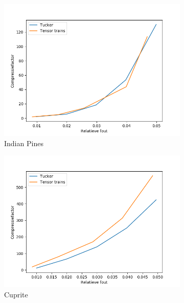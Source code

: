 \begin{figure}[]
\centering
\begin{subfigure}{0.48\textwidth}
  \centering
  \includegraphics[width=\linewidth]{images/tensor_trains_st_hosvd_results_Indian_Pines.png}
  \caption{Indian Pines}
\end{subfigure}
\begin{subfigure}{0.48\textwidth}
  \centering
  \includegraphics[width=\linewidth]{images/tensor_trains_st_hosvd_results_Cuprite.png}
  \caption{Cuprite}
\end{subfigure}
\\
\begin{subfigure}{0.48\textwidth}
  \centering

\end{subfigure}
\end{figure}

